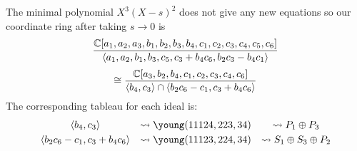 \documentclass{article}
\begin{document}
The minimal polynomial $X^3(X-s)^2$ does not give any new equations so our coordinate ring after taking $s \rightarrow 0$ is
$$\frac{\mathbb C[a_1,a_2,a_3,b_1,b_2,b_3,b_4,c_1,c_2,c_3,c_4,c_5,c_6]}{\langle a_1,a_2,b_1,b_3,c_5,c_3+b_4c_6,b_2c_3-b_4c_1 \rangle}$$
$$ \cong \frac{\mathbb C[a_3,b_2,b_4,c_1,c_2,c_3,c_4,c_6]}{\langle b_4,c_3 \rangle \cap \langle b_2c_6-c_1,c_3+b_4c_6 \rangle}$$
The corresponding tableau for each ideal is:
\[\begin{array}{ccc}\vspace{1mm}
    \langle b_4,c_3 \rangle &\leadsto \young(11124,223,34) &\leadsto P_1 \oplus P_3 \\
    \langle b_2c_6-c_1,c_3+b_4c_6 \rangle &\leadsto \young(11123,224,34) &\leadsto S_1 \oplus S_3 \oplus P_2
\end{array}
\]
\end{document}
